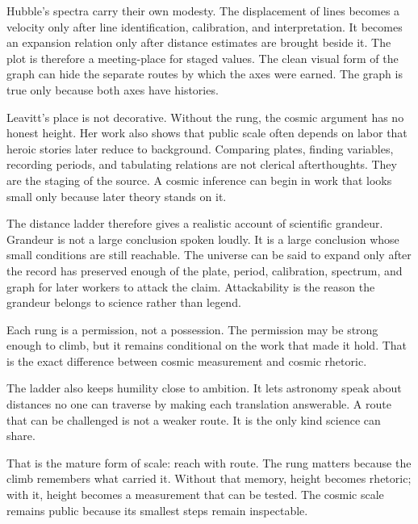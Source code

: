 Hubble's spectra carry their own modesty. The displacement of lines
becomes a velocity only after line identification, calibration, and
interpretation. It becomes an expansion relation only after distance
estimates are brought beside it. The plot is therefore a meeting-place for
staged values. The clean visual form of the graph can hide the separate
routes by which the axes were earned. The graph is
true only because both axes have histories.

Leavitt's place is not decorative. Without the rung, the cosmic argument
has no honest height. Her work also shows that public scale often depends on labor that heroic
stories later reduce to background.
Comparing plates, finding variables, recording periods, and tabulating
relations are not clerical afterthoughts. They are the staging of the
source. A cosmic inference can begin in work that looks small only because
later theory stands on it.

The distance ladder therefore gives a realistic account of scientific
grandeur. Grandeur is not a large conclusion spoken loudly. It is a large
conclusion whose small conditions are still reachable. The universe can
be said to expand only after the record has preserved enough of the plate,
period, calibration, spectrum, and graph for later workers to attack the
claim. Attackability is the reason the grandeur belongs to science rather
than legend.

Each rung is a permission, not a possession. The permission may be strong
enough to climb, but it remains conditional on the work that made it hold.
That is the exact difference between cosmic measurement and cosmic
rhetoric.

The ladder also keeps humility close to ambition. It lets astronomy speak
about distances no one can traverse by making each translation answerable. A route that can be challenged is not a weaker
route. It is the only kind science can share.

That is the mature form of scale: reach with route. The rung matters
because the climb remembers what carried it. Without that memory, height
becomes rhetoric; with it, height becomes a measurement that can be
tested. The cosmic scale remains public because its smallest steps remain
inspectable.

